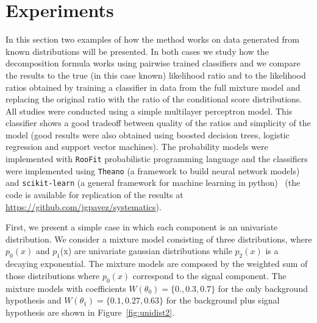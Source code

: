 \documentclass[a4paper]{jpconf}
\begin{document}
\section{Experiments}
 In this section two examples of how the method works on data generated from known distributions will be presented. In both cases we study how the decomposition formula works using pairwise trained classifiers and we compare the results to the true (in this case known) likelihood ratio and to the likelihood ratios obtained by training a classifier in data from the full mixture model and replacing the original ratio with the ratio of the conditional score distributions. All studies were conducted using a simple multilayer perceptron model. This classifier shows a good tradeoff between quality of the ratios and simplicity of the model (good results were also obtained using boosted decision trees, logistic regression and support vector machines). The probability models were implemented with \texttt{RooFit} probabilistic programming language and the classifiers were implemented using \texttt{Theano} (a framework to build neural network models) and \texttt{scikit-learn} (a general framework for machine learning in python)~\cite{Verkerke:2003ir,bergstra:2010-scipy,scikit-learn} (the code is available for replication of the results at \url{https://github.com/jgpavez/systematics}).

First, we present a simple case in which each component is an univariate distribution. We consider a mixture model consisting of three distributions, where $p_0(x)$ and $p_1$(x) are univariate gaussian distributions while $p_2(x)$ is a decaying exponential. The mixture models are composed by the weighted sum of those distributions where $p_0(x)$ correspond to the signal component.  The mixture models with coefficients $W(\theta_0) = \{0., 0.3, 0.7\}$ for the only background hypothesis and $W(\theta_1) = \{0.1, 0.27, 0.63\}$ for the background plus signal hypothesis are shown in Figure~\ref{fig:unidist2}.
 
\end{document}

